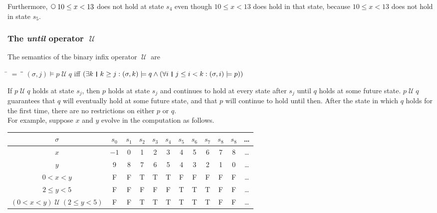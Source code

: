 \documentclass[fleqn, leqno]{article}
\newcommand{\mymathindent}{24pt}                    %
\newcommand{\Until}{\;\mathcal{U}\;}
\newcommand{\Next}{\;\,\text{\raisebox{3.5pt}{\circle{6}}}}
\newcommand{\myqedtab}{\hspace{388.5pt}}              %
\newcommand{\thedr}{\rule[-.25ex]{.32mm}{1.75ex}}   %
\newcommand{\dr}{\;\,\thedr\,\;}                    %
\newcommand{\rb}{:}                                 %
\newcommand{\all}{\forall}                          %
\newcommand{\ext}{\exists}                          %
\begin{document}
Furthermore, $\Next 10\le x< 13$ does not hold at state $s_4$ even though $10\le x< 13$ does hold in that state,
because $10\le x< 13$ does not hold in state $s_5$.

\subsubsection*{The \textit{until} operator $\Until$}

The semantics of the binary infix operator $\Until$ are

\begin{tabbing}
\hspace{\mymathindent} \= $= \;$ \= \myqedtab \= \kill
  \> $(\sigma, j) \models p \Until q$ \quad iff \quad $(\ext k \dr k \ge j \rb (\sigma,k) \models q \land
      (\all i \dr j\le i < k \rb (\sigma,i) \models p))$
\end{tabbing}

If $p \Until q$ holds at state $s_j$, then $p$ holds at state $s_j$ and continues to hold at every state
after $s_j$ until $q$ holds at some future state.
$p \Until q$ guarantees that $q$ will eventually hold at some future state, and that $p$ will continue to
hold until then.
After the state in which $q$ holds for the first time, there are no restrictions on either $p$ or $q$.\\

For example, suppose $x$ and $y$ evolve in the computation as follows.\\

\begin{tabular}{c|ccccccccccc}
  $\sigma$                  & $s_0$ & $s_1$ & $s_2$ & $s_3$ & $s_4$ & $s_5$ & $s_6$ & $s_7$ & $s_8$ & $s_8$ & \dots \\
  \hline
  $x$                       & $-1$  & 0     & 1     & 2     & 3     & 4     & 5     &  6    &  7    &  8    &  \dots\\
  $y$                       & 9     & 8     & 7     & 6     & 5     & 4     & 3     &  2    &  1    &  0    &  \dots\\
  $0<x<y$                   & F     & F     & T     & T     & T     & F     & F     &  F    &  F    &  F    &  \dots\\
  $2\le y<5$                & F     & F     & F     & F     & F     & T     & T     &  T    &  F    &  F    &  \dots\\
  $(0<x<y)\Until(2\le y<5)$ & F     & F     & T     & T     & T     & T     & T     &  T    &  F    &  F    &  \dots\\
\end{tabular}\\
\end{document}
